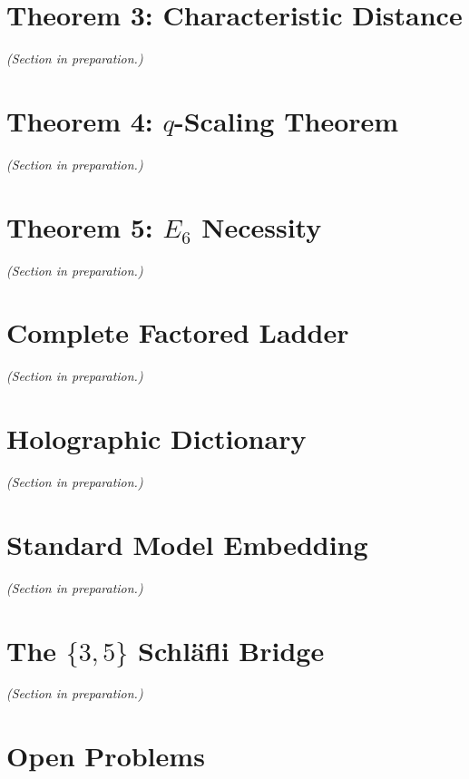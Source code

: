 \documentclass[12pt]{article}
\begin{document}
\section{Theorem 3: Characteristic Distance}\label{sec:dist}
\emph{(Section in preparation.)}

\section{Theorem 4: $q$-Scaling Theorem}\label{sec:qscale}
\emph{(Section in preparation.)}

\section{Theorem 5: $E_6$ Necessity}\label{sec:e6}
\emph{(Section in preparation.)}

\section{Complete Factored Ladder}\label{sec:ladder}
\emph{(Section in preparation.)}

\section{Holographic Dictionary}\label{sec:holo}
\emph{(Section in preparation.)}

\section{Standard Model Embedding}\label{sec:sm}
\emph{(Section in preparation.)}

\section{The $\{3,5\}$ Schl\"afli Bridge}\label{sec:schlafli}
\emph{(Section in preparation.)}

\section{Open Problems}\label{sec:open}
\end{document}
